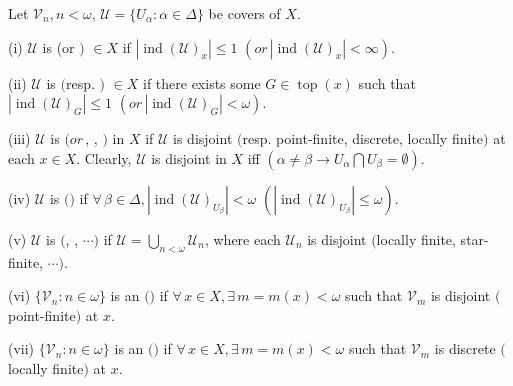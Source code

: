 \documentclass[prelim.tex]{subfiles}
\begin{document}
{ \label{def:1.1.3} Let  $\mathscr{V}_n, n<\omega$,  
	$\mathscr{U}=\{ U_\alpha: \alpha \in \Delta\}$ be covers of  $X$.
	
\textup{(i)}  $ \mathscr{U}$ is  
    \textup{(}or $)$
     $\in X$ if $|\operatorname{ind}(\mathscr{U})_x|\leq 1$ 
     $(or\, |\operatorname{ind}(\mathscr{U})_x| < \infty)$.

\textup{(ii)} $\mathscr{U}$ is  
  $($resp. $)$ 
   $\in X$
  if there exists some $G\in\operatorname{top}(x)$ such that
  $|\operatorname{ind}(\mathscr{U})_G| \leq 1 $ 
  $(or \, |\operatorname{ind}(\mathscr{U})_G|  < \omega).$

\textup{(iii)} $\mathscr{U}$ is  
 $(or \, $,
  , 
  $)$ in $X$
  if $\mathscr{U}$ is  
  disjoint $($resp. point-finite, discrete, locally finite$)$ at each $x\in X$.
  Clearly, $\mathscr{U}$ is disjoint in  $X$ iff  
  $(\alpha \neq \beta \rightarrow  
  U_\alpha\bigcap U_\beta= \emptyset).$

\textup{(iv)}  $\mathscr{U}$  is 
   $($$)$ if
   $\forall \, \beta\in\Delta, |\operatorname{ind}(
    \mathscr{U})_{U_{\beta}}| < \omega$   
    $(|\operatorname{ind}(\mathscr{U})_{U_{\beta}}| \le\omega)$.

\textup{(v)}  $\mathscr{U}$  is 
$($, 
, $\cdots)$ if
$\mathscr{U} = \bigcup_{n < \omega}\mathscr{U}_n$,
where each $\mathscr{U}_n$ is disjoint $($locally finite, star-finite, $\cdots)$.

\textup{(vi)}  $\{\mathscr{V}_n: n \in\omega\}$  is an 
$($$)$
if $\forall \, x \in X, \exists \, m = m(x) < \omega$ such that 
$\mathscr{V}_m$ is disjoint $($point-finite$)$ at $x$.

\textup{(vii)}  $\{\mathscr{V}_n: n \in\omega\}$  is an 
$($$)$
if $\forall \, x \in X, \exists \, m = m(x)  < \omega$ such that 
$\mathscr{V}_m$ is discrete $($locally finite$)$ at $x$.
} %
\end{document}
